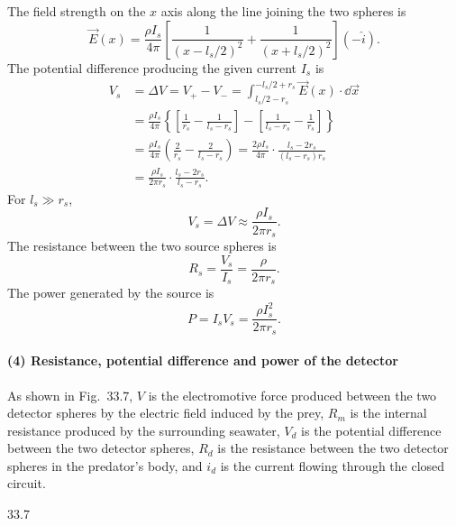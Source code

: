 The field strength on the $x$ axis along the line joining the two spheres is
\[
\vec{E}(x)=\frac{\rho I_s}{4\pi}\left[\frac{1}{(x-l_s/2)^2}+\frac{1}{(x+l_s/2)^2}\right](-\hat{i}).
\]
The potential difference producing the given current $I_s$ is
\begin{align*}
V_s&=\Delta V=V_+-V_-=\int_{l_s/2-r_s}^{-l_s/2+r_s}\vec{E}(x)\cdot\dd\vec{x}\\
&=\frac{\rho I_s}{4\pi}\left\{\left[\frac{1}{r_s}-\frac{1}{l_s-r_s}\right]-\left[\frac{1}{l_s-r_s}-\frac{1}{r_s}\right]\right\}\\
&=\frac{\rho I_s}{4\pi}\left(\frac{2}{r_s}-\frac{2}{l_s-r_s}\right)
=\frac{2\rho I_s}{4\pi}\cdot\frac{l_s-2r_s}{(l_s-r_s)r_s}\\
&=\frac{\rho I_s}{2\pi r_s}\cdot\frac{l_s-2r_s}{l_s-r_s}.
\end{align*}
For $l_s\gg r_s$,
\[
V_s=\Delta V\approx\frac{\rho I_s}{2\pi r_s}.
\]
The resistance between the two source spheres is
\[
R_s=\frac{V_s}{I_s}=\frac{\rho}{2\pi r_s}.
\]
The power generated by the source is
\[
P=I_sV_s=\frac{\rho I_s^2}{2\pi r_s}.
\]

\paragraph{(4) Resistance, potential difference and power of the detector}

As shown in Fig.~33.7, $V$ is the electromotive force produced between the two detector spheres by the electric field induced by the prey, $R_m$ is the internal resistance produced by the surrounding seawater, $V_d$ is the potential difference between the two detector spheres, $R_d$ is the resistance between the two detector spheres in the predator's body, and $i_d$ is the current flowing through the closed circuit.

\begin{figbox}{33.7}
\end{figbox}


